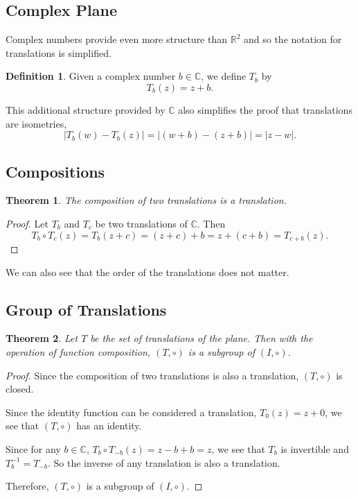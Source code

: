 \documentclass[
]{book}
\newtheorem{theorem}{Theorem}[chapter]
\theoremstyle{definition}
\newtheorem{definition}{Definition}[chapter]
\theoremstyle{definition}
\theoremstyle{definition}
\theoremstyle{definition}
\theoremstyle{remark}
\begin{document}
\hypertarget{complex-plane-1}{%
\subsection{Complex Plane}\label{complex-plane-1}}

Complex numbers provide even more structure than \(\mathbb{R}^2\) and so the notation for translations is simplified.

\begin{definition}
Given a complex number \(b\in \mathbb{C}\), we define \(T_b\) by \[T_b(z) = z+b.\]
\end{definition}

This additional structure provided by \(\mathbb{C}\) also simplifies the proof that translations are isometries,
\[ \left| T_b(w)-T_b(z)\right| = \left|(w+b)-(z+b)\right| = |z-w|.\]

\hypertarget{compositions}{%
\subsection{Compositions}\label{compositions}}

\begin{theorem}
The composition of two translations is a translation.
\end{theorem}

\begin{proof}
Let \(T_b\) and \(T_c\) be two translations of \(\mathbb{C}\). Then
\[T_b\circ T_c(z) = T_b(z+c) = (z+c)+b = z + (c+b) = T_{c+b}(z).\]
\end{proof}

We can also see that the order of the translations does not matter.

\hypertarget{group-of-translations}{%
\subsection{Group of Translations}\label{group-of-translations}}

\begin{theorem}
Let \(T\) be the set of translations of the plane. Then with the operation of function composition, \((T,\circ)\) is a subgroup of \((I,\circ )\).
\end{theorem}

\begin{proof}
Since the composition of two translations is also a translation, \((T,\circ)\) is closed.

Since the identity function can be considered a translation, \(T_0(z)=z+0\), we see that \((T,\circ)\) has an identity.

Since for any \(b\in \mathbb{C}\), \(T_b \circ T_{-b} (z) = z-b+b=z\), we see that \(T_b\) is invertible and \(T_b^{-1} = T_{-b}\). So the inverse of any translation is also a translation.

Therefore, \((T,\circ)\) is a subgroup of \((I,\circ )\).
\end{proof}
\end{document}
